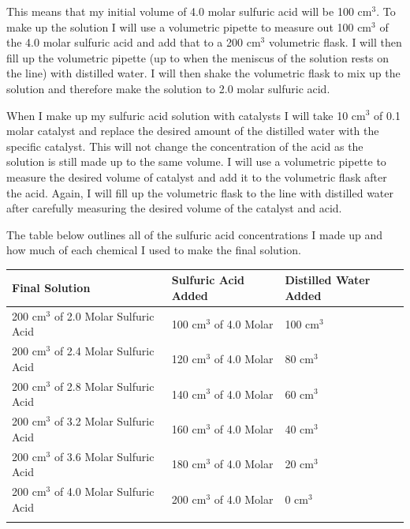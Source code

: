 This means that my initial volume of 4.0 molar sulfuric acid will be 100 cm$^3$. To make up the solution I will use a volumetric pipette to measure out 100 cm$^3$ of the 4.0 molar sulfuric acid and add that to a 200 cm$^3$ volumetric flask. I will then fill up the volumetric pipette (up to when the meniscus of the solution rests on the line) with distilled water. I will then shake the volumetric flask to mix up the solution and therefore make the solution to 2.0 molar sulfuric acid. 

When I make up my sulfuric acid solution with catalysts I will take 10 cm$^3$ of 0.1 molar catalyst and replace the desired amount of the distilled water with the specific catalyst. This will not change the concentration of the acid as the solution is still made up to the same volume. I will use a volumetric pipette to measure the desired volume of catalyst and add it to the volumetric flask after the acid. Again, I will fill up the volumetric flask to the line with distilled water after carefully measuring the desired volume of the catalyst and acid.

The table below outlines all of the sulfuric acid concentrations I made up and how much of each chemical I used to make the final solution.


\begin{center}

\begin{tabular}{|l|l||l|}
    \hline
    \textbf{Final Solution} & \textbf{Sulfuric Acid Added} & \textbf{Distilled Water Added} \\ \hline

200 cm$^3$  of 2.0 Molar Sulfuric Acid & 100 cm$^3$ of 4.0 Molar & 100 cm$^3$ \\ \hline

200 cm$^3$  of 2.4 Molar Sulfuric Acid & 120 cm$^3$ of 4.0 Molar & 80 cm$^3$ \\ \hline

200 cm$^3$  of 2.8 Molar Sulfuric Acid & 140 cm$^3$ of 4.0 Molar & 60 cm$^3$ \\ \hline

200 cm$^3$  of 3.2 Molar Sulfuric Acid & 160 cm$^3$ of 4.0 Molar & 40 cm$^3$ \\ \hline

200 cm$^3$  of 3.6 Molar Sulfuric Acid & 180 cm$^3$ of 4.0 Molar & 20 cm$^3$ \\ \hline

200 cm$^3$  of 4.0 Molar Sulfuric Acid & 200 cm$^3$ of 4.0 Molar & 0 cm$^3$ \\ \hline



\label{tab:Sulfuric Acid Prepared Solutions}
\end{tabular}
\end{center}





